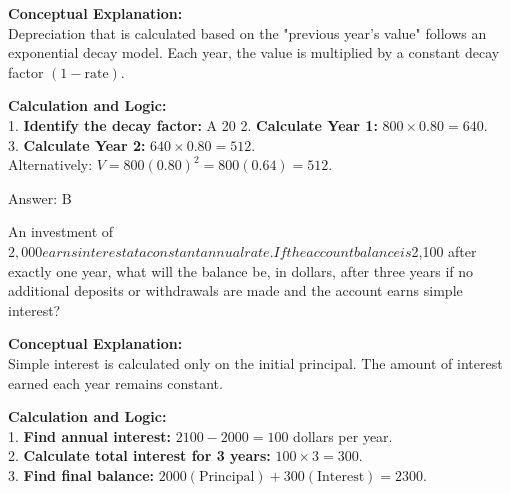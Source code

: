 \documentclass[11pt,paper=a4,answers]{exam}
\begin{document}
\begin{questions}
\begin{solution}
\textbf{Conceptual Explanation:} \\
Depreciation that is calculated based on the "previous year's value" follows an exponential decay model. Each year, the value is multiplied by a constant decay factor $(1 - \text{rate})$.

\vspace{30pt}

\textbf{Calculation and Logic:} \\
1. \textbf{Identify the decay factor:} A 20%
2. \textbf{Calculate Year 1:} $800 \times 0.80 = 640$. \\
3. \textbf{Calculate Year 2:} $640 \times 0.80 = 512$. \\
Alternatively: $V = 800(0.80)^2 = 800(0.64) = 512$.

\vspace{30pt}

Answer: \colorbox{yellow!100}{B}
\end{solution}

\vspace{60pt}

\question
An investment of $2,000 earns interest at a constant annual rate. If the account balance is $2,100 after exactly one year, what will the balance be, in dollars, after three years if no additional deposits or withdrawals are made and the account earns simple interest?

\begin{solution}
\textbf{Conceptual Explanation:} \\
Simple interest is calculated only on the initial principal. The amount of interest earned each year remains constant.

\vspace{30pt}

\textbf{Calculation and Logic:} \\
1. \textbf{Find annual interest:} $2100 - 2000 = 100$ dollars per year. \\
2. \textbf{Calculate total interest for 3 years:} $100 \times 3 = 300$. \\
3. \textbf{Find final balance:} $2000 (\text{Principal}) + 300 (\text{Interest}) = 2300$.

\vspace{30pt}


\end{solution}
\end{questions}
\end{document}
